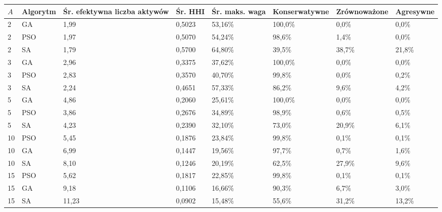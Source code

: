 \begin{tabular}{llllllll}
\toprule
$A$ & Algorytm & Śr. efektywna liczba aktywów & Śr. HHI & Śr. maks. waga & Konserwatywne & Zrównoważone & Agresywne \\
\midrule
2 & GA & 1{,}99 & 0{,}5023 & 53{,}16\% & 100{,}0\% & 0{,}0\% & 0{,}0\% \\
2 & PSO & 1{,}97 & 0{,}5070 & 54{,}24\% & 98{,}6\% & 1{,}4\% & 0{,}0\% \\
2 & SA & 1{,}79 & 0{,}5700 & 64{,}80\% & 39{,}5\% & 38{,}7\% & 21{,}8\% \\
3 & GA & 2{,}96 & 0{,}3375 & 37{,}62\% & 100{,}0\% & 0{,}0\% & 0{,}0\% \\
3 & PSO & 2{,}83 & 0{,}3570 & 40{,}70\% & 99{,}8\% & 0{,}0\% & 0{,}2\% \\
3 & SA & 2{,}24 & 0{,}4651 & 57{,}33\% & 86{,}2\% & 9{,}6\% & 4{,}2\% \\
5 & GA & 4{,}86 & 0{,}2060 & 25{,}61\% & 100{,}0\% & 0{,}0\% & 0{,}0\% \\
5 & PSO & 3{,}86 & 0{,}2676 & 34{,}89\% & 98{,}9\% & 0{,}6\% & 0{,}5\% \\
5 & SA & 4{,}23 & 0{,}2390 & 32{,}10\% & 73{,}0\% & 20{,}9\% & 6{,}1\% \\
10 & PSO & 5{,}45 & 0{,}1876 & 23{,}84\% & 99{,}8\% & 0{,}1\% & 0{,}1\% \\
10 & GA & 6{,}99 & 0{,}1447 & 19{,}56\% & 97{,}7\% & 0{,}7\% & 1{,}6\% \\
10 & SA & 8{,}10 & 0{,}1246 & 20{,}19\% & 62{,}5\% & 27{,}9\% & 9{,}6\% \\
15 & PSO & 5{,}62 & 0{,}1817 & 22{,}85\% & 99{,}8\% & 0{,}1\% & 0{,}1\% \\
15 & GA & 9{,}18 & 0{,}1106 & 16{,}66\% & 90{,}3\% & 6{,}7\% & 3{,}0\% \\
15 & SA & 11{,}23 & 0{,}0902 & 15{,}48\% & 55{,}6\% & 31{,}2\% & 13{,}2\% \\
\bottomrule
\end{tabular}
